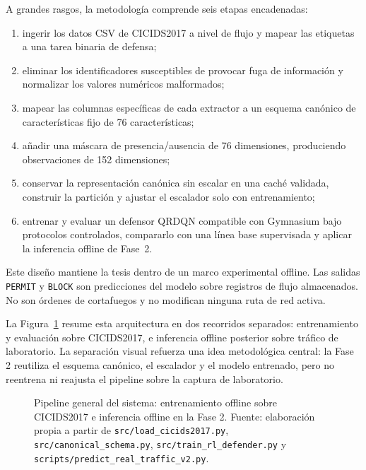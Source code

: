 A grandes rasgos, la metodología comprende seis etapas encadenadas:
\begin{enumerate}
    \item ingerir los datos CSV de CICIDS2017 a nivel de flujo y mapear las etiquetas a una tarea binaria de defensa;
    \item eliminar los identificadores susceptibles de provocar fuga de información y normalizar los valores numéricos malformados;
    \item mapear las columnas específicas de cada extractor a un esquema canónico de características fijo de 76 características;
    \item añadir una máscara de presencia/ausencia de 76 dimensiones, produciendo observaciones de 152 dimensiones;
    \item conservar la representación canónica sin escalar en una caché validada, construir la partición y ajustar el escalador solo con entrenamiento;
    \item entrenar y evaluar un defensor QRDQN compatible con Gymnasium bajo protocolos controlados, compararlo con una línea base supervisada y aplicar la inferencia offline de Fase~2.
\end{enumerate}

Este diseño mantiene la tesis dentro de un marco experimental offline. Las salidas \texttt{PERMIT} y \texttt{BLOCK} son predicciones del modelo sobre registros de flujo almacenados. No son órdenes de cortafuegos y no modifican ninguna ruta de red activa.

La Figura~\ref{fig:pipeline-sistema} resume esta arquitectura en dos recorridos separados: entrenamiento y evaluación sobre CICIDS2017, e inferencia offline posterior sobre tráfico de laboratorio. La separación visual refuerza una idea metodológica central: la Fase 2 reutiliza el esquema canónico, el escalador y el modelo entrenado, pero no reentrena ni reajusta el pipeline sobre la captura de laboratorio.

\begin{figure}[htbp]
\centering
\resizebox{\textwidth}{!}{}
\caption[Pipeline general del sistema]{Pipeline general del sistema: entrenamiento offline sobre CICIDS2017 e inferencia offline en la Fase 2. Fuente: elaboración propia a partir de \texttt{src/load\_cicids2017.py}, \texttt{src/canonical\_schema.py}, \texttt{src/train\_rl\_defender.py} y \texttt{scripts/predict\_real\_traffic\_v2.py}.}
\label{fig:pipeline-sistema}
\end{figure}


